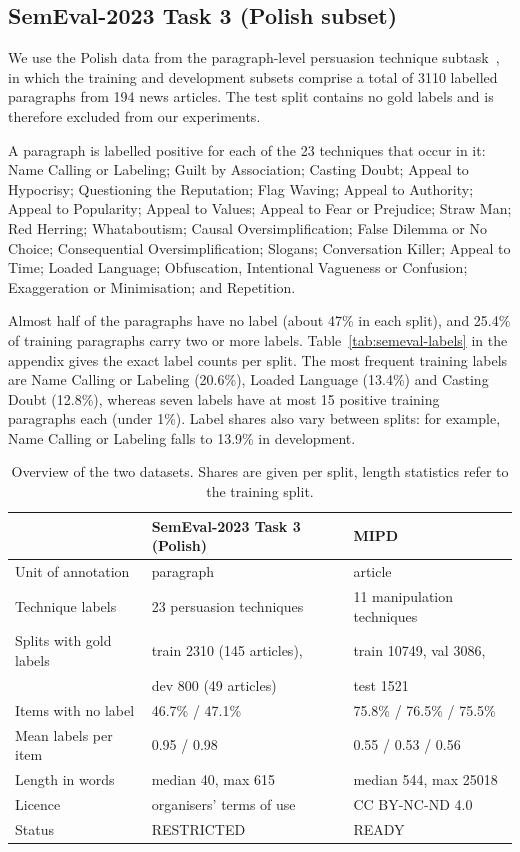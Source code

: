 \documentclass[11pt]{article}
\begin{document}
\subsection{SemEval-2023 Task 3 (Polish subset)}

We use the Polish data from the paragraph-level persuasion technique subtask~\cite{2023-semeval}, in which the training and development subsets comprise a total of 3110 labelled paragraphs from 194 news articles. The test split contains no gold labels and is therefore excluded from our experiments.

A paragraph is labelled positive for each of the 23 techniques that occur in it: Name Calling or Labeling; Guilt by Association; Casting Doubt; Appeal to Hypocrisy; Questioning the Reputation; Flag Waving; Appeal to Authority; Appeal to Popularity; Appeal to Values; Appeal to Fear or Prejudice; Straw Man; Red Herring; Whataboutism; Causal Oversimplification; False Dilemma or No Choice; Consequential Oversimplification; Slogans; Conversation Killer; Appeal to Time; Loaded Language; Obfuscation, Intentional Vagueness or Confusion; Exaggeration or Minimisation; and Repetition.

Almost half of the paragraphs have no label (about 47\% in each split), and 25.4\% of training paragraphs carry two or more labels. Table~\ref{tab:semeval-labels} in the appendix gives the exact label counts per split. The most frequent training labels are Name Calling or Labeling (20.6\%), Loaded Language (13.4\%) and Casting Doubt (12.8\%), whereas seven labels have at most 15 positive training paragraphs each (under 1\%). Label shares also vary between splits: for example, Name Calling or Labeling falls to 13.9\% in development.

\begin{table}[H]
\centering
\small
\begin{tabular}{@{}P{0.26\columnwidth}P{0.31\columnwidth}P{0.31\columnwidth}@{}}
\toprule
 & SemEval-2023 Task 3 (Polish) & MIPD \\
\midrule
Unit of annotation & paragraph & article \\
Technique labels & 23 persuasion techniques & 11 manipulation techniques \\
Splits with gold labels & train 2310 (145 articles), & train 10749, val 3086, \\
 & dev 800 (49 articles) & test 1521 \\
Items with no label & 46.7\% / 47.1\% & 75.8\% / 76.5\% / 75.5\% \\
Mean labels per item & 0.95 / 0.98 & 0.55 / 0.53 / 0.56 \\
Length in words & median 40, max 615 & median 544, max 25018 \\
Licence & organisers' terms of use & CC BY-NC-ND 4.0 \\
Status & RESTRICTED & READY \\
\bottomrule
\end{tabular}
\caption{Overview of the two datasets. Shares are given per split, length statistics refer to the training split.}
\label{tab:data}
\end{table}
\end{document}

